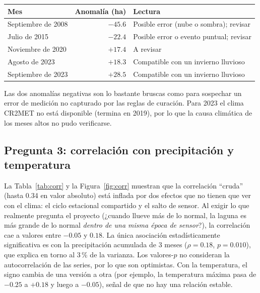 \documentclass[11pt,a4paper]{article}
\begin{document}
\begin{center}
\begin{tabular}{lrl}
\toprule
Mes & Anomalía (ha) & Lectura \\
\midrule
Septiembre de 2008 & $-45.6$ & Posible error (nube o sombra); revisar \\
Julio de 2015 & $-22.4$ & Posible error o evento puntual; revisar \\
Noviembre de 2020 & $+17.4$ & A revisar \\
Agosto de 2023 & $+18.3$ & Compatible con un invierno lluvioso \\
Septiembre de 2023 & $+28.5$ & Compatible con un invierno lluvioso \\
\bottomrule
\end{tabular}
\end{center}
Las dos anomalías negativas son lo bastante bruscas como para sospechar un error de medición no capturado por las reglas de curación. Para 2023 el clima CR2MET no está disponible (termina en 2019), por lo que la causa climática de los meses altos no pudo verificarse.

\subsection{Pregunta 3: correlación con precipitación y temperatura}

La Tabla~\ref{tab:corr} y la Figura~\ref{fig:corr} muestran que la correlación ``cruda'' (hasta 0.34 en valor absoluto) está inflada por dos efectos que no tienen que ver con el clima: el ciclo estacional compartido y el salto de sensor. Al exigir lo que realmente pregunta el proyecto (¿cuando llueve más de lo normal, la laguna es más grande de lo normal \emph{dentro de una misma época de sensor}?), la correlación cae a valores entre $-0.05$ y $0.18$. La única asociación estadísticamente significativa es con la precipitación acumulada de 3 meses ($\rho=0.18$, $p=0.010$), que explica en torno al 3\,\% de la varianza. Los valores-$p$ no consideran la autocorrelación de las series, por lo que son optimistas. Con la temperatura, el signo cambia de una versión a otra (por ejemplo, la temperatura máxima pasa de $-0.25$ a $+0.18$ y luego a $-0.05$), señal de que no hay una relación estable.
\end{document}
